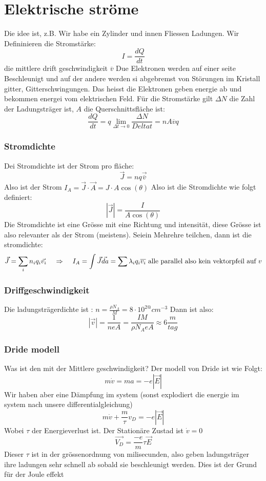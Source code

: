 \documentclass{article}
\newcommand{\mspc}{\hspace{0.4cm}}
\begin{document}
\section{Elektrische ströme} Die idee ist, z.B. Wir habe ein Zylinder und innen Fliessen Ladungen. Wir Defininieren die Stromstärke: \[I=\frac{dQ}{dt}\] die mittlere drift geschwindigkeit $\overline{v}$
Due Elektronen werden auf einer seite Beschleunigt und auf der andere werden si abgebremst von Störungen im Kristall gitter, Gitterschwingungen. Das heisst die Elektronen geben energie ab und bekommen energei vom elektrischen Feld. 
Für die Stromstärke gilt $\Delta N$ die Zahl der Ladungsträger ist, $A$ die Querschnittsfläche ist: \[\frac{dQ}{dt}=q\lim_{\Delta t\rightarrow 0}\frac{\Delta N}{Delta t}=n A \overline{v}q\]
\subsubsection{Stromdichte}Dei Stromdichte ist der Strom pro fläche:\[\vec{J}=nq\vec{\overline{v}}\] Also ist der Strom $I_A=\vec{J}\cdot\vec{A}=J\cdot A\cos(\theta)$ Also ist die Stromdichte wie folgt definiert:\[\left|\vec{J}\right|=\frac{I}{A\cos(\theta)}\]
Die Stromdichte ist eine Grösse mit eine Richtung und intensität, diese Grösse ist also relevanter als der Strom (meistens). Seiein Mehrehre teilchen, dann ist die stromdichte:
\[\vec{J}=\sum_in_iq_i\vec{v_i}\mspc\Rightarrow\mspc I_A=\int \vec{J}\vec{da}=\sum\lambda_iq_i\overline{v_i}\text{ alle parallel also kein vektorpfeil auf } v\]
\subsubsection{Driffgeschwindigkeit} Die ladungsträgerdichte ist : $n=\frac{\rho N_A}{M}=8\cdot 10^{2@} cm^{-3}$ Dann ist also:\[\left|\vec{v}\right|=\frac{1}{neA}=\frac{IM}{\rho N_A e A}\approx 6\frac{m}{tag}\]
\subsubsection{Dride modell} Was ist den mit der Mittlere geschwindigkeit? Der modell von Dride ist wie Folgt:\[m\dot{v}=ma=-e\left|\vec{E}\right|\] Wir haben aber eine Dämpfung im system (sonst explodiert die energie im system nach unsere differentialgleichung)
\[m\dot{v}+\frac{m}{\tau}v_D=-e\left|\vec{E}\right|\] Wobei $\tau$ der Energieverlust ist. Der Stationäre Zustad ist $\dot{v}=0$\[\vec{V_D}=\frac{-e}{m}\tau\vec{E}\]
Dieser $\tau$ ist in der grössenordnung von milisecunden, also geben ladungsträger ihre ladungen sehr schnell ab sobald sie beschleunigt werden. Dies ist der Grund für der Joule effekt
\end{document}
